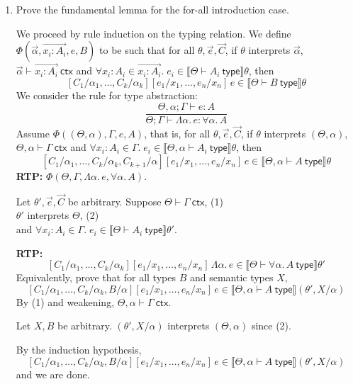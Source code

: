 \documentclass[10pt,\jkfside,a4paper]{article}
\newcommand{\answer}[1]{
    \begin{tcolorbox}[colframe=black, colback=white, sharp corners, boxrule=0.2mm, breakable]
        #1
    \end{tcolorbox}
}
\begin{document}
\begin{enumerate}
\begin{enumerate}
        \item
        Prove the fundamental lemma for the for-all introduction case.

        \answer{
            We proceed by rule induction on the typing relation. We define $\Phi(\vec{\alpha}, \overrightarrow{x_i : A_i}, e, B)$ to be such that for all $\theta, \vec{e}, \vec{C}$, if $\theta$ interprets $\vec{\alpha}$, $\vec{\alpha} \vdash \overrightarrow{x_i : A_i}\ \mathsf{ctx}$ and $\forall x_i : A_i \in \overrightarrow{x_i : A_i}.\; e_i \in \llbracket \Theta \vdash A_i\ \mathsf{type} \rrbracket \theta$, then
            \[
                [C_1/\alpha_1, \ldots, C_k/\alpha_k][e_1/x_1, \ldots, e_n/x_n]\,e \in \llbracket \Theta \vdash B\ \mathsf{type} \rrbracket \theta
            \]
            We consider the rule for type abstraction:
            \[
                \frac{\Theta, \alpha ; \Gamma \vdash e : A}{\Theta ; \Gamma \vdash \Lambda \alpha.\, e : \forall \alpha.\, A}
            \]
            Assume $\Phi((\Theta, \alpha), \Gamma, e, A)$, that is, for all $\theta, \vec{e}, \vec{C}$, if $\theta$ interprets $(\Theta, \alpha)$, $\Theta, \alpha \vdash \Gamma\ \mathsf{ctx}$ and $\forall x_i : A_i \in \Gamma.\; e_i \in \llbracket \Theta, \alpha \vdash A_i\ \mathsf{type} \rrbracket \theta$, then
            \[
                [C_1/\alpha_1, \ldots, C_k/\alpha_k, C_{k+1}/\alpha][e_1/x_1, \ldots, e_n/x_n]\,e \in \llbracket \Theta, \alpha \vdash A\ \mathsf{type} \rrbracket \theta
            \]
            \textbf{RTP:} $\Phi(\Theta, \Gamma, \Lambda \alpha.\, e, \forall \alpha.\, A)$.

            Let $\theta', \vec{e}, \vec{C}$ be arbitrary. Suppose $\Theta \vdash \Gamma\ \mathsf{ctx}$, \hfill (1) \\
            $\theta'$ interprets $\Theta$, \hfill (2) \\
            and $\forall x_i : A_i \in \Gamma.\; e_i \in \llbracket \Theta \vdash A_i\ \mathsf{type} \rrbracket \theta'$.

            \textbf{RTP:}
            \[
                [C_1/\alpha_1, \ldots, C_k/\alpha_k][e_1/x_1, \ldots, e_n/x_n]\,\Lambda \alpha.\, e \in \llbracket \Theta \vdash \forall \alpha.\, A\ \mathsf{type} \rrbracket \theta'
            \]
            Equivalently, prove that for all types $B$ and semantic types $X$,
            \[
                [C_1/\alpha_1, \ldots, C_k/\alpha_k, B/\alpha][e_1/x_1, \ldots, e_n/x_n]\,e \in \llbracket \Theta, \alpha \vdash A\ \mathsf{type} \rrbracket (\theta', X/\alpha)
            \]
            By (1) and weakening, $\Theta, \alpha \vdash \Gamma\ \mathsf{ctx}$.

            Let $X, B$ be arbitrary. $(\theta', X/\alpha)$ interprets $(\Theta, \alpha)$ since (2).

            By the induction hypothesis, 
            \[
                [C_1/\alpha_1, \ldots, C_k/\alpha_k, B/\alpha][e_1/x_1, \ldots, e_n/x_n]\,e \in \llbracket \Theta, \alpha \vdash A\ \mathsf{type} \rrbracket (\theta', X/\alpha)
            \]
            and we are done.
        }
    \end{enumerate}
\end{enumerate}
\end{document}
